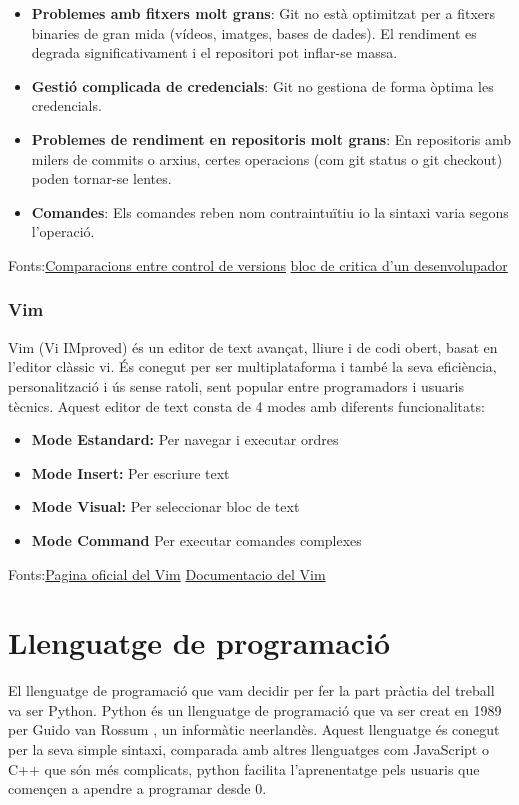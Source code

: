\begin{itemize}
\item \textbf{Problemes amb fitxers molt grans}: Git no està optimitzat per a fitxers binaries de gran mida (vídeos, imatges, bases de dades). El rendiment es degrada significativament i el repositori pot inflar-se massa.

\item \textbf{Gestió complicada de credencials}: Git no gestiona de forma òptima les credencials.

\item \textbf{Problemes de rendiment en repositoris molt grans}: En repositoris amb milers de commits o arxius, certes operacions (com git status o git checkout) poden tornar-se lentes.

\item \textbf{Comandes}: Els comandes reben nom contraintuïtiu io la sintaxi varia segons l'operació.
\end{itemize}
Fonts:\href{https://ieeexplore.ieee.org/document/8259410}{Comparacions entre control de versions} \href{https://stevebennett.me/2012/02/24/10-things-i-hate-about-git/}{bloc de critica d'un desenvolupador}
\subsubsection{Vim}\label{subsubsec:Vim}
Vim (Vi IMproved) és un editor de text avançat, lliure i de codi obert, basat en l'editor clàssic vi. És conegut per ser multiplataforma i també la seva eficiència, personalització i ús sense ratoli, sent popular entre programadors i usuaris tècnics. Aquest editor de text consta de 4 modes amb diferents funcionalitats:
\begin{itemize}
 \item \textbf{Mode Estandard:} Per navegar i executar ordres
 \item \textbf{Mode Insert:} Per escriure text
 \item \textbf{Mode Visual:} Per seleccionar bloc de text
 \item \textbf{Mode Command} Per executar comandes complexes
\end{itemize}
Fonts:\href{https://www.vim.org/}{Pagina oficial del Vim} \href{https://vimhelp.org/}{Documentacio del Vim}
\section{Llenguatge de programació}\label{sec:4.4}

El llenguatge de programació que vam decidir per fer la part pràctia del treball va ser Python. Python és un llenguatge de programació que va ser creat en 1989 per Guido van Rossum , un informàtic neerlandès. Aquest llenguatge és conegut per la seva simple sintaxi, comparada amb altres llenguatges com JavaScript o C++ que són més complicats, python facilita l'aprenentatge pels usuaris que començen a apendre a programar desde 0.

